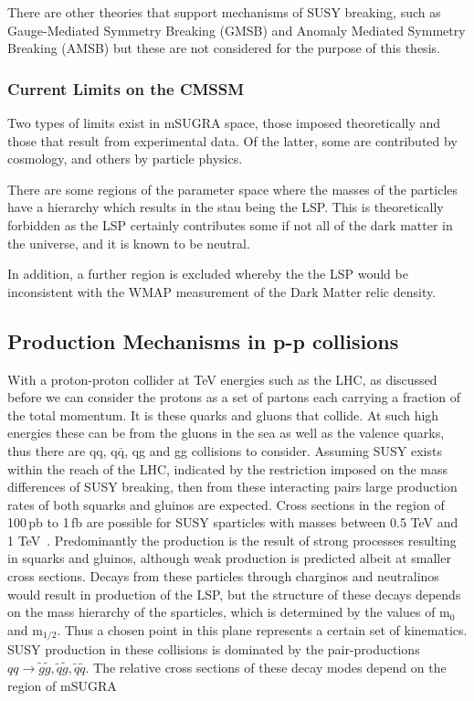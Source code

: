 There are other theories that support mechanisms of SUSY breaking, such as Gauge-Mediated Symmetry Breaking (GMSB) and Anomaly Mediated Symmetry Breaking (AMSB) but these are not considered for the purpose of this thesis. 

\subsubsection{Current Limits on the CMSSM}

Two types of limits exist in mSUGRA space, those imposed theoretically and those that result from experimental data. Of the latter, some are contributed by cosmology, and others by particle physics. 

There are some regions of the parameter space where the masses of the particles have a hierarchy which results in the stau being the LSP. This is theoretically forbidden as the LSP certainly contributes some if not all of the dark matter in the universe, and it is known to be neutral. 

In addition, a further region is excluded whereby the the LSP would be inconsistent with the WMAP measurement of the Dark Matter relic density. 

\subsection{Production Mechanisms in p-p collisions}
With a proton-proton collider at TeV energies such as the LHC, as discussed before we can consider the protons as a set of partons each carrying a fraction of the total momentum. It is these quarks and gluons that collide. At such high energies these can be from the gluons in the sea as well as the valence quarks, thus there are qq, $\textrm{q}\bar{\textrm{q}}$, qg and gg collisions to consider.
Assuming SUSY exists within the reach of the LHC, indicated by the restriction imposed on the mass differences of SUSY breaking, then from these interacting pairs large production rates of both squarks and gluinos are expected. Cross sections in the region of 100\,pb to 1\,fb are possible for SUSY sparticles with masses between 0.5 TeV and 1 TeV~\cite{early}. Predominantly the production is the result of strong processes resulting in squarks and gluinos, although weak production is predicted albeit at smaller cross sections. Decays from these particles through charginos and neutralinos would result in production of the LSP, but the structure of these decays depends on the mass hierarchy of the sparticles, which is determined by the values of m$_{0}$ and m$_{1/2}$.  Thus a chosen point in this plane represents a certain set of kinematics. SUSY production in these collisions is dominated by the pair-productions $ qq \rightarrow \tilde{g} \tilde{g}, \tilde{q}\tilde{g}, \tilde{q} \tilde{q}$. The relative cross sections of these decay modes depend on the region of mSUGRA 

